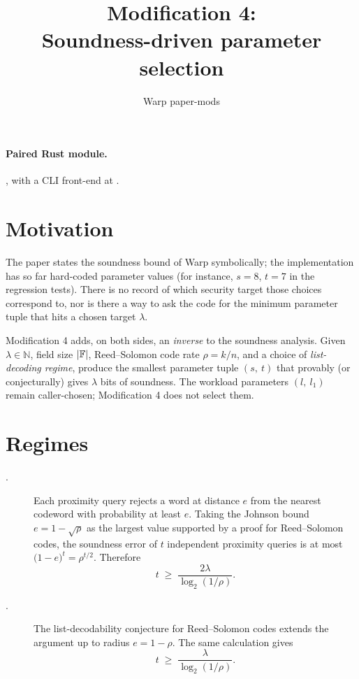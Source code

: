 \documentclass{article}
\title{Modification 4: \\ Soundness-driven parameter selection}
\author{Warp paper-mods}
\date{}
\begin{document}
\maketitle

\paragraph{Paired Rust module.} , with a CLI front-end
at .

\section{Motivation}

The paper states the soundness bound of Warp symbolically; the implementation
has so far hard-coded parameter values (for instance, \(s = 8\), \(t = 7\)
in the regression tests). There is no record of which security target those
choices correspond to, nor is there a way to ask the code for the minimum
parameter tuple that hits a chosen target \(\lambda\).

Modification 4 adds, on both sides, an \emph{inverse} to the soundness
analysis. Given
\(\lambda \in \mathbb{N}\), field size \(\left\lvert\mathbb{F}\right\rvert\), Reed--Solomon code rate
\(\rho = k/n\), and a choice of \emph{list-decoding regime}, produce the
smallest parameter tuple \((s,\ t)\) that provably (or conjecturally) gives
\(\lambda\) bits of soundness. The workload parameters \((l,\ l_1)\) remain
caller-chosen; Modification 4 does not select them.

\section{Regimes}

\begin{description}
  \item[.] Each proximity query rejects a word at distance
        \(e\) from the nearest codeword with probability at least \(e\).
        Taking the Johnson bound \(e = 1 - \sqrt{\rho}\) as the largest
        value supported by a proof for Reed--Solomon codes, the soundness
        error of \(t\) independent proximity queries is at most
        \(\bigl(1 - e\bigr)^{t} = \rho^{t/2}\). Therefore
        \[
            t \;\geq\; \frac{2\lambda}{\log_2(1/\rho)}.
        \]
  \item[.] The list-decodability conjecture for
        Reed--Solomon codes extends the argument up to radius
        \(e = 1 - \rho\). The same calculation gives
        \[
            t \;\geq\; \frac{\lambda}{\log_2(1/\rho)}.
        \]
\end{description}
\end{document}
